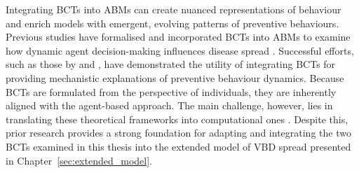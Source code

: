 Integrating BCTs into ABMs can create nuanced representations of behaviour and enrich models with emergent, evolving patterns of preventive behaviours. Previous studies have formalised and incorporated BCTs into ABMs to examine how dynamic agent decision-making influences disease spread \cite{durham_incorporating_2012, abdulkareem_risk_2020, weston_infection_2018, bedson_review_2021}. Successful efforts, such as those by \citet{durham_incorporating_2012} and \citet{kurchyna_seeing_2024}, have demonstrated the utility of integrating BCTs for providing mechanistic explanations of preventive behaviour dynamics. Because BCTs are formulated from the perspective of individuals, they are inherently aligned with the agent-based approach. The main challenge, however, lies in translating these theoretical frameworks into computational ones \cite{durham_incorporating_2012}. Despite this, prior research provides a strong foundation for adapting and integrating the two BCTs examined in this thesis into the extended model of VBD spread presented in Chapter~\ref{sec:extended_model}.

